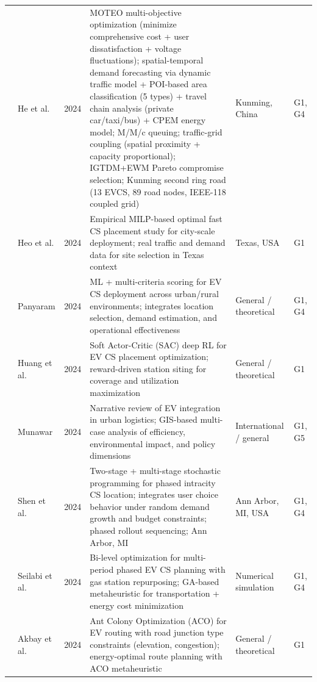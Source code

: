 \documentclass[letterpaper, 12pt, oneside, doublespacing]{Thesis}
\begin{document}
\begin{longtable}{L{0.9cm} L{2.2cm} L{0.8cm} L{3.3cm} L{2.5cm} L{1.5cm}}
\cite{optimal_evcs_2024} & He et al. & 2024 & MOTEO multi-objective optimization (minimize comprehensive cost + user dissatisfaction + voltage fluctuations); spatial-temporal demand forecasting via dynamic traffic model + POI-based area classification (5 types) + travel chain analysis (private car/taxi/bus) + CPEM energy model; M/M/c queuing; traffic-grid coupling (spatial proximity + capacity proportional); IGTDM+EWM Pareto compromise selection; Kunming second ring road (13 EVCS, 89 road nodes, IEEE-118 coupled grid) & Kunming, China & G1, G4 \\
\cite{optimal_planning_2024} & Heo et al. & 2024 & Empirical MILP-based optimal fast CS placement study for city-scale deployment; real traffic and demand data for site selection in Texas context & Texas, USA & G1 \\
\cite{optimization_strategies_2024} & Panyaram & 2024 & ML + multi-criteria scoring for EV CS deployment across urban/rural environments; integrates location selection, demand estimation, and operational effectiveness & General {\slash} theoretical & G1, G4 \\
\cite{optimizing_ev_2024} & Huang et al. & 2024 & Soft Actor-Critic (SAC) deep RL for EV CS placement optimization; reward-driven station siting for coverage and utilization maximization & General {\slash} theoretical & G1 \\
\cite{optimizing_urban_2024} & Munawar & 2024 & Narrative review of EV integration in urban logistics; GIS-based multi-case analysis of efficiency, environmental impact, and policy dimensions & International {\slash} general & G1, G5 \\
\cite{sequential_charging_2024} & Shen et al. & 2024 & Two-stage + multi-stage stochastic programming for phased intracity CS location; integrates user choice behavior under random demand growth and budget constraints; phased rollout sequencing; Ann Arbor, MI & Ann Arbor, MI, USA & G1, G4 \\
\cite{sustainable_planning_2024} & Seilabi et al. & 2024 & Bi-level optimization for multi-period phased EV CS planning with gas station repurposing; GA-based metaheuristic for transportation + energy cost minimization & Numerical simulation & G1, G4 \\
\cite{the_electric_2024} & Akbay et al. & 2024 & Ant Colony Optimization (ACO) for EV routing with road junction type constraints (elevation, congestion); energy-optimal route planning with ACO metaheuristic & General {\slash} theoretical & G1 \\

\end{longtable}
\end{document}
